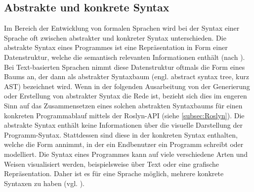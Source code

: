 \subsection{Abstrakte und konkrete Syntax}
Im Bereich der Entwicklung von formalen Sprachen wird bei der Syntax einer Sprache oft zwischen abstrakter und konkreter Syntax unterschieden. Die abstrakte Syntax eines Programmes ist eine Repräsentation in Form einer Datenstruktur, welche die semantisch relevanten Informationen enthält (nach \cite[S. 26]{Voelter:13}). Bei Text-basierten Sprachen nimmt diese Datenstruktur oftmals die Form eines Baums an, der dann als abstrakter Syntaxbaum (engl. abstract syntax tree, kurz AST) bezeichnet wird. Wenn in der folgenden Ausarbeitung von der Generierung oder Erstellung von abstrakter Syntax die Rede ist, bezieht sich dies im engeren Sinn auf das Zusammensetzen eines solchen abstrakten Syntaxbaums für einen konkreten Programmablauf mittels der Roslyn-API (siehe \ref{subsec:Roslyn}). Die abstrakte Syntax enthält keine Informationen über die visuelle Darstellung der Programm-Syntax. Stattdessen sind diese in der konkreten Syntax enthalten, welche die Form annimmt, in der ein Endbenutzer ein Programm schreibt oder modelliert. Die Syntax eines Programmes kann auf viele verschiedene Arten und Weisen visualisiert werden, beispielsweise über Text oder eine grafische Repräsentation. Daher ist es für eine Sprache möglich, mehrere konkrete Syntaxen zu haben (vgl. \cite[S. 6f]{Kleppe:09}).
